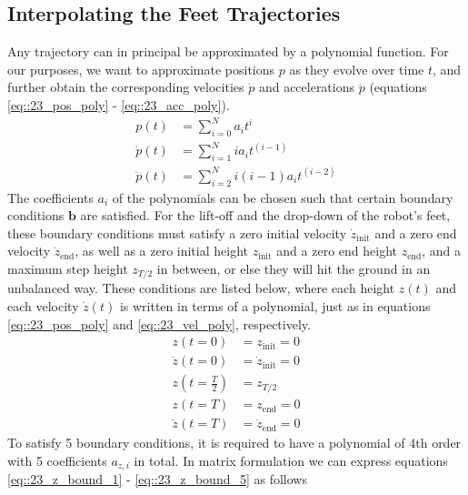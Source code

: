 \subsection{Interpolating the Feet Trajectories}
Any trajectory can in principal be approximated by a polynomial function. For our purposes, we want to approximate positions $p$ as they evolve over time $t$, and further obtain the corresponding velocities $\dot{p}$ and accelerations $\ddot{p}$ (equations \ref{eq::23_pos_poly} - \ref{eq::23_acc_poly}).  
\begin{align}
	p(t) &= \sum_{i = 0}^{N}a_it^i 
	\label{eq::23_pos_poly}\\
	\dot{p}(t) &= \sum_{i = 1}^{N}ia_it^{(i-1)} 
	\label{eq::23_vel_poly}\\
	\ddot{p}(t) &= \sum_{i = 2}^{N}i(i-1)a_it^{(i-2)}
	\label{eq::23_acc_poly}
\end{align}
The coefficients $a_i$ of the polynomials can be chosen such that certain boundary conditions $\bm{b}$ are satisfied. For the lift-off and the drop-down of the robot's feet, these boundary conditions must satisfy a zero initial velocity $\dot{z}_\text{init}$ and a zero end velocity $\dot{z}_\text{end}$, as well as a zero initial height $z_\text{init}$ and a zero end height $z_\text{end}$, and a maximum step height $z_{T/2}$ in between, or else they will hit the ground in an unbalanced way. These conditions are listed below, where each height $z(t)$ and each velocity $\dot{z}(t)$ is written in terms of a polynomial, just as in equations \ref{eq::23_pos_poly} and \ref{eq::23_vel_poly}, respectively. 
\begin{align}
	z(t = 0) &= z_\text{init} = 0
	\label{eq::23_z_bound_1} \\
	\dot{z}(t = 0) &= \dot{z}_\text{init} = 0 \\
	z(t = \frac{T}{2}) &= z_{T/2}
	\label{eq::23_step}\\  
	z(t = T) &= z_\text{end} = 0 \\
	\dot{z}(t = T) &= \dot{z}_\text{end} = 0 
	\label{eq::23_z_bound_5}
\end{align}
To satisfy 5 boundary conditions, it is required to have a polynomial of 4th order with 5 coefficients $a_{z,i}$ in total. In matrix formulation we can express equations \ref{eq::23_z_bound_1} - \ref{eq::23_z_bound_5} as follows
